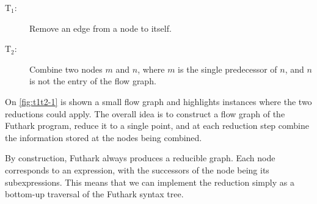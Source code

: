\begin{description}
  \item[T$_{1}$:] Remove an edge from a node to itself.

  \item[T$_{2}$:] Combine two nodes $m$ and $n$, where $m$ is the
    single predecessor of $n$, and $n$ is not the entry of the flow
    graph.
\end{description}

On \cref{fig:t1t2-1} is shown a small flow graph and highlights
instances where the two reductions could apply.  The overall idea is
to construct a flow graph of the Futhark program, reduce it to a
single point, and at each reduction step combine the information
stored at the nodes being combined.

By construction, Futhark always produces a reducible graph.  Each node
corresponds to an expression, with the successors of the node being
its subexpressions.  This means that we can implement the reduction
simply as a bottom-up traversal of the Futhark syntax tree.

